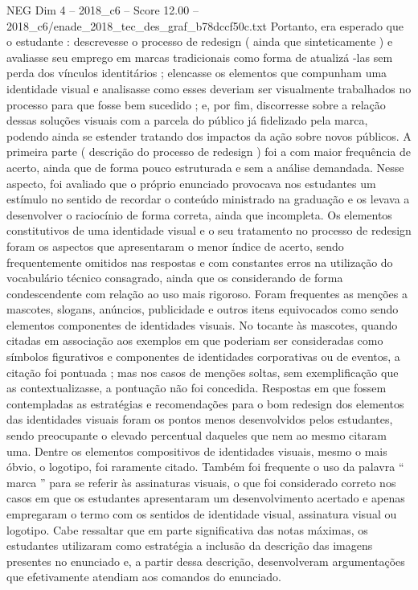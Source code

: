 \begin{textsample}{NEG Dim 4 – 2018\_c6 – Score 12.00 – 2018\_c6/enade\_2018\_tec\_des\_graf\_b78dccf50c.txt}
Portanto, era esperado que o estudante : descrevesse o processo de redesign ( ainda que sinteticamente ) e avaliasse seu emprego em marcas tradicionais como forma de atualizá -las sem perda dos vínculos identitários ; elencasse os elementos que compunham uma identidade visual e analisasse como esses deveriam ser visualmente trabalhados no processo para que fosse bem sucedido ; e, por fim, discorresse sobre a relação dessas soluções visuais com a parcela do público já fidelizado pela marca, podendo ainda se estender tratando dos impactos da ação sobre novos públicos.
A primeira parte ( descrição do processo de redesign ) foi a com maior frequência de acerto, ainda que de forma pouco estruturada e sem a análise demandada.
Nesse aspecto, foi avaliado que o próprio enunciado provocava nos estudantes um estímulo no sentido de recordar o conteúdo ministrado na graduação e os levava a desenvolver o raciocínio de forma correta, ainda que incompleta.
Os elementos constitutivos de uma identidade visual e o seu tratamento no processo de redesign foram os aspectos que apresentaram o menor índice de acerto, sendo frequentemente omitidos nas respostas e com constantes erros na utilização do vocabulário técnico consagrado, ainda que os considerando de forma condescendente com relação ao uso mais rigoroso.
Foram frequentes as menções a mascotes, slogans, anúncios, publicidade e outros itens equivocados como sendo elementos componentes de identidades visuais.
No tocante às mascotes, quando citadas em associação aos exemplos em que poderiam ser consideradas como símbolos figurativos e componentes de identidades corporativas ou de eventos, a citação foi pontuada ; mas nos casos de menções soltas, sem exemplificação que as contextualizasse, a pontuação não foi concedida.
Respostas em que fossem contempladas as estratégias e recomendações para o bom redesign dos elementos das identidades visuais foram os pontos menos desenvolvidos pelos estudantes, sendo preocupante o elevado percentual daqueles que nem ao mesmo citaram uma.
Dentre os elementos compositivos de identidades visuais, mesmo o mais óbvio, o logotipo, foi raramente citado.
Também foi frequente o uso da palavra “ marca ” para se referir às assinaturas visuais, o que foi considerado correto nos casos em que os estudantes apresentaram um desenvolvimento acertado e apenas empregaram o termo com os sentidos de identidade visual, assinatura visual ou logotipo.
Cabe ressaltar que em parte significativa das notas máximas, os estudantes utilizaram como estratégia a inclusão da descrição das imagens presentes no enunciado e, a partir dessa descrição, desenvolveram argumentações que efetivamente atendiam aos comandos do enunciado.

\end{textsample}
